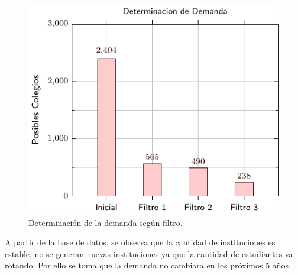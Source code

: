 \begin{figure}
  \centering
  \includegraphics[width=0.75\linewidth]{./Figures/bar-plot-demand.pdf}
  \caption{Determinación de la demanda según filtro.}
\end{figure}

A partir de la base de datos, se observa que la cantidad de instituciones es
estable, no se generan nuevas instituciones ya que la cantidad de estudiantes
va rotando.
Por ello se toma que la demanda no cambiara en los próximos 5 años.
